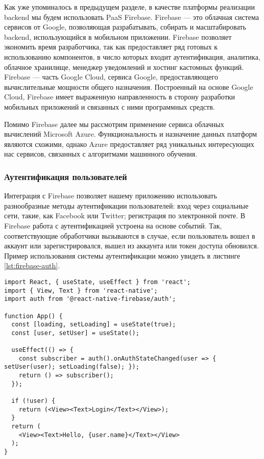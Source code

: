 Как уже упоминалось в предыдущем разделе, в качестве платформы реализации backend мы будем использовать PaaS Firebase\cite{firebase-overview}. Firebase --- это облачная система сервисов от Google, позволяющая разрабатывать, собирать и масштабировать backend, использующийся в мобильном приложении. Firebase позволяет экономить время разработчика, так как предоставляет ряд готовых к использованию компонентов, в число которых входит аутентификация, аналитика, облачное хранилище, менеджер уведомлений и хостинг кастомных функций. Firebase --- часть Google Cloud, сервиса Google, предоставляющего вычислительные мощности общего назначения. Построенный на основе Google Cloud, Firebase имеет выраженную направленность в сторону разработки мобильных приложений и связанных с ними программных средств.

Помимо Firebase далее мы рассмотрим применение сервиса облачных вычислений Microsoft Azure\cite{azure-cognitive-services}. Функциональность и назначение данных платформ являются схожими, однако Azure предоставляет ряд уникальных интересующих нас сервисов, связанных с алгоритмами машинного обучения.

\subsubsection{Аутентификация пользователей}
Интеграция с Firebase позволяет нашему приложению использовать разнообразные методы аутентификации пользователей: вход через социальные сети, такие, как Facebook или Twitter; регистрация по электронной почте. В Firebase работа с аутентификацией устроена на основе событий. Так, соответствующие обработчики вызываются в случае, если пользователь вошел в аккаунт или зарегистрировался, вышел из аккаунта или токен доступа обновился. Пример использования системы аутентификации можно увидеть в листинге \ref{lst:firebase-auth}.
\begin{lstlisting}[basicstyle=\fontsize{11}{11}\selectfont,tabsize=4,breaklines=true,caption={Пример обработки событий аутентификации.},captionpos=b,label={lst:firebase-auth}]
import React, { useState, useEffect } from 'react';
import { View, Text } from 'react-native';
import auth from '@react-native-firebase/auth';

function App() {
  const [loading, setLoading] = useState(true);
  const [user, setUser] = useState();
  
  useEffect(() => {
    const subscriber = auth().onAuthStateChanged(user => { setUser(user); setLoading(false); });
    return () => subscriber();
  });
  
  if (!user) {
    return (<View><Text>Login</Text></View>);
  }
  return (
    <View><Text>Hello, {user.name}</Text></View>
  );
}
\end{lstlisting}

